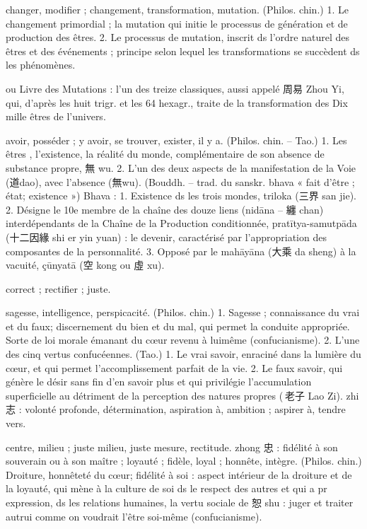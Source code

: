 \begin{Def}[yi 易]
    changer, modifier ; changement, transformation, mutation. (Philos. chin.) 1. Le changement primordial ; la mutation qui initie le processus de génération et de production des êtres. 2. Le processus de mutation, inscrit ds l’ordre naturel des êtres et des événements ; principe selon lequel les transformations se succèdent ds les phénomènes.
\end{Def}
\begin{Def}[易經 Yi Jing]
    ou Livre des Mutations : l’un des treize classiques, aussi appelé 周易 Zhou Yi, qui, d’après les huit trigr. et les 64 hexagr., traite de la transformation des Dix mille êtres de l’univers. 
\end{Def}
\begin{Def}[you 有]
    avoir, posséder ; y avoir, se trouver, exister, il y a. (Philos. chin. – Tao.) 1. Les êtres , l’existence, la réalité du monde, complémentaire de son absence de substance propre, 無 wu. 2. L’un des deux aspects de la manifestation de la Voie (道dao), avec l’absence (無wu). (Bouddh. – trad. du sanskr. bhava « fait d’être ; état; existence ») Bhava : 1. Existence ds les trois mondes, triloka (三界 san jie). 2. Désigne le 10e membre de la chaîne des douze liens (nidāna – 纏 chan) interdépendants de la Chaîne de la Production conditionnée, pratītya-samutpāda (十二因緣 shi er yin yuan) : le devenir, caractérisé par l’appropriation des composantes de la personnalité. 3. Opposé par le mahāyāna (大乘 da sheng) à la vacuité, çūnyatā (空 kong ou 虛 xu). 
\end{Def}
\begin{Def}[zheng 正]
    correct ; rectifier ; juste.  
\end{Def}
\begin{Def}[zhi 智]
    sagesse, intelligence, perspicacité. (Philos. chin.) 1. Sagesse ; connaissance du vrai et du faux; discernement du bien et du mal, qui permet la conduite appropriée. Sorte de loi morale émanant du cœur revenu à luimême (confucianisme). 2. L’une des cinq vertus confucéennes. (Tao.) 1. Le vrai savoir, enraciné dans la lumière du cœur, et qui permet l’accomplissement parfait de la vie. 2. Le faux savoir, qui génère le désir sans fin d’en savoir plus et qui privilégie l’accumulation superficielle au détriment de la perception des natures propres ( 老子 Lao Zi). zhi 志 : volonté profonde, détermination, aspiration à, ambition ; aspirer à, tendre vers.
\end{Def}
\begin{Def}[zhong 中]
    centre, milieu ; juste milieu, juste mesure, rectitude. zhong 忠 : fidélité à son souverain ou à son maître ; loyauté ; fidèle, loyal ; honnête, intègre. (Philos. chin.)     Droiture, honnêteté du cœur; fidélité à soi : aspect intérieur de la droiture et de la loyauté, qui mène à la culture de soi ds le respect des autres et qui a pr expression, ds les relations humaines, la vertu sociale de 恕 shu : juger et traiter autrui comme on voudrait l’être soi-même (confucianisme). 
\end{Def}
 

